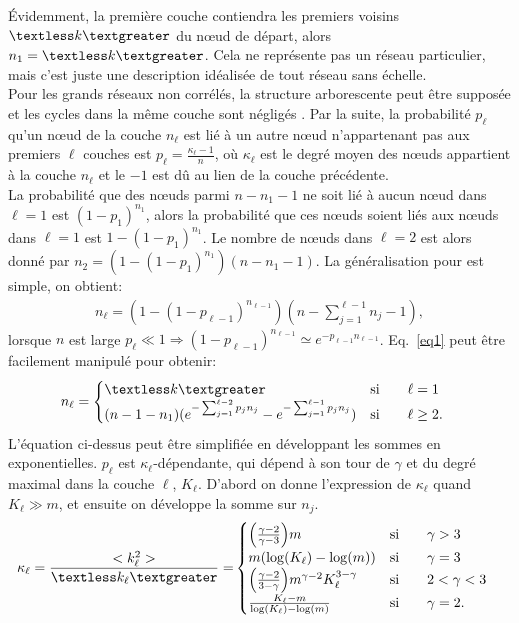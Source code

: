 Évidemment, la première couche contiendra les premiers voisins $\km$ du nœud de départ, alors $n_1=\km$. Cela ne représente pas un réseau particulier, mais c'est juste une description idéalisée de tout réseau sans échelle. \\
Pour les grands réseaux non corrélés, la structure arborescente peut être supposée et les cycles dans la même couche sont négligés \cite{Cohen-Havlin2003,Cohen-Havlin2009}. Par la suite, la probabilité $ p_{\ell} $ qu'un nœud de la couche $n_\ell$ est lié à un autre nœud n'appartenant pas aux premiers $\ell$ couches est $p_{\ell}=\frac{\kappa_{\ell}-1}{n}$, où $\kappa_{\ell}$ est le degré moyen des nœuds appartient à la couche $n_\ell$ et le $-1$ est dû au lien de la couche précédente. \\
La probabilité que des nœuds parmi $n-n_1-1$ ne soit lié à aucun nœud dans $\ell=1$ est $(1-p_1)^{n_1}$, alors la probabilité que ces nœuds soient liés aux nœuds dans $\ell=1$ est $1-(1-p_1)^{n_1}$. Le nombre de nœuds dans $\ell=2$ est alors donné par $n_2=(1- (1-p_1)^{n_1})(n-n_1-1)$. La généralisation pour \nl est simple, on obtient:
\begin{align}
n_{\ell}= (1-(1-p_{\ell-1})^{n_{\ell-1}})(n-\sum_{j=1}^{\ell-1} n_j-1),
\label{eq1}
\end{align}
lorsque $n$ est large $p_{\ell}\ll1 \Longrightarrow (1-p_{\ell-1})^{n_{\ell-1}}\simeq e^{-p_{\ell-1}n_{\ell-1}} $. Eq.~\ref{eq1}
peut être facilement manipulé pour obtenir:
\begin{align}
n_{\ell} &=
\begin{cases}
\km & \text{si}\qquad \ell=1 \\
(n-1-n_1)(e^{-\sum_{j=1}^{\ell-2}p_j n_j}-e^{-\sum_{j=1}^{\ell-1}p_j n_j}) & \text{si}\qquad \ell \ge 2.
\end{cases}
\label{eq2}
\end{align}
L'équation ci-dessus peut être simplifiée en développant les sommes en exponentielles. $p_{\ell}$ est $\kappa_{\ell}$-dépendante, qui dépend à son tour de $\gamma$ et du degré maximal dans la couche $\ell$, $K_{\ell}$. D'abord on donne l'expression de $\kappa_{\ell}$ quand $K_{\ell}\gg m$, et ensuite on développe la somme sur $n_j$.
\begin{align}
\kappa_{\ell} =\frac{<k_{\ell}^2>}{\textless k_{\ell} \textgreater}=&
\begin{cases}
\Big(\frac{\gamma-2}{\gamma-3}\Big)m & \text{si} \qquad \gamma >3 \\ 
m (\log(K_{\ell})-\log(m))  & \text{si} \qquad \gamma =3 \\
\Big(\frac{\gamma-2}{3-\gamma}\Big)m^{\gamma-2} K_{\ell}^{3-\gamma}  & \text{si} \qquad 2<\gamma<3 \\
\frac{K_{\ell}-m}{\log(K_{\ell})-\log(m)} & \text{si} \qquad \gamma=2.
\end{cases}
\label{eq4}
\end{align}
